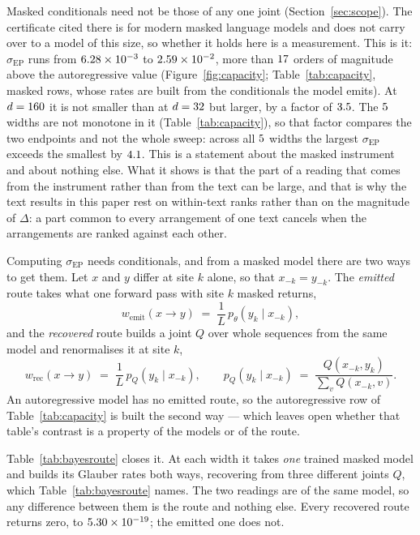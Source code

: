 \documentclass[11pt]{article}
\newcommand{\sigEP}{\sigma_{\mathrm{EP}}}
\begin{document}
Masked conditionals need not be those of any one joint
(Section~\ref{sec:scope}).  The certificate cited there is for modern masked
language models and does not carry over to a model of this size, so whether
it holds here is a measurement.  This is it: $\sigEP$ runs from
$6.28\times10^{-3}$ to $2.59\times10^{-2}$, more than $17$ orders of
magnitude above the autoregressive value (Figure~\ref{fig:capacity};
Table~\ref{tab:capacity}, masked rows, whose rates are built from the
conditionals the model emits).  At $d = 160$ it is not smaller than at
$d = 32$ but larger, by a factor of $3.5$.
The $5$ widths are not monotone in it
(Table~\ref{tab:capacity}), so that factor compares the two endpoints and
not the whole sweep: across all $5$ widths the largest $\sigEP$
exceeds the smallest by $4.1$.  This is a statement
about the masked instrument and about nothing else.  What it shows is that
the part of a reading that comes from the instrument rather than from the
text can be large, and that is why the text results in this paper rest on
within-text ranks rather than on the magnitude of $\Delta$: a part common to
every arrangement of one text cancels when the arrangements are ranked
against each other.


Computing $\sigEP$ needs conditionals, and from a masked model there are two
ways to get them.  Let $x$ and $y$ differ at site $k$ alone, so that
$x_{-k} = y_{-k}$.  The \emph{emitted} route takes what one forward pass
with site $k$ masked returns,
\begin{equation}
w_{\mathrm{emit}}(x \to y) \;=\; \frac{1}{L}\, p_\theta(y_k \mid x_{-k}) ,
\label{eq:wemit}
\end{equation}
and the \emph{recovered} route builds a joint $Q$ over whole sequences from
the same model and renormalises it at site $k$,
\begin{equation}
w_{\mathrm{rec}}(x \to y) \;=\; \frac{1}{L}\, p_Q(y_k \mid x_{-k}) ,
\qquad
p_Q(y_k \mid x_{-k}) \;=\;
  \frac{Q(x_{-k}, y_k)}{\sum_{v} Q(x_{-k}, v)} .
\label{eq:wrec}
\end{equation}
An autoregressive model has no emitted route, so the autoregressive row of
Table~\ref{tab:capacity} is built the second way --- which leaves open
whether that table's contrast is a property of the models or of the route.

Table~\ref{tab:bayesroute} closes it.  At each width it takes \emph{one}
trained masked model and builds its Glauber rates both ways, recovering from
three different joints $Q$, which Table~\ref{tab:bayesroute} names.
The two readings are of the same model, so any
difference between them is the route and nothing else.  Every recovered
route returns zero, to $5.30\times10^{-19}$; the emitted one does not.
\end{document}
